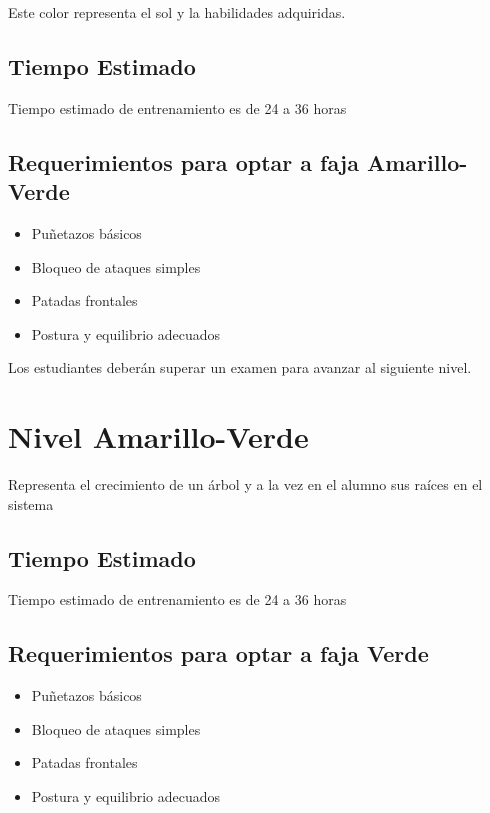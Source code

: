 Este color representa el sol y la habilidades adquiridas.

\subsection[Duración]{Tiempo Estimado}

Tiempo estimado de entrenamiento es de 24 a 36 horas

\subsection{Requerimientos para optar a faja Amarillo-Verde}

\begin{itemize}
	\item Puñetazos básicos
	\item Bloqueo de ataques simples
	\item Patadas frontales
	\item Postura y equilibrio adecuados
\end{itemize}

Los estudiantes deberán superar un examen para avanzar al siguiente nivel.

\section{Nivel Amarillo-Verde}

Representa el crecimiento de un árbol y a la vez en el alumno sus raíces en el sistema

\subsection[Duración]{Tiempo Estimado}

Tiempo estimado de entrenamiento es de 24 a 36 horas

\subsection{Requerimientos para optar a faja Verde}

\begin{itemize}
	\item Puñetazos básicos
	\item Bloqueo de ataques simples
	\item Patadas frontales
	\item Postura y equilibrio adecuados
\end{itemize}

